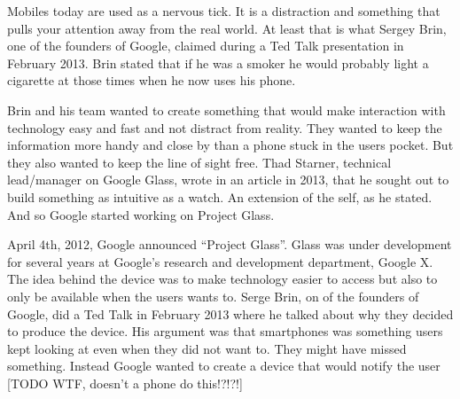 Mobiles today are used as a nervous tick. It is a distraction and something that pulls your attention away from the real world. At least that is what Sergey Brin, one of the founders of Google, claimed during a Ted Talk presentation in February 2013.\cite{tedtalkWhyGlass} Brin stated that if he was a smoker he would probably light a cigarette at those times when he now uses his phone.

Brin and his team wanted to create something that would make interaction with technology easy and fast and not distract from reality. They wanted to keep the information more handy and close by than a phone stuck in the users pocket. But they also wanted to keep the line of sight free. Thad Starner, technical lead/manager on Google Glass, wrote in an article in 2013,\cite{6504855} that he sought out to build something as intuitive as a watch. An extension of the self, as he stated. And so Google started working on Project Glass. 








April 4th, 2012, Google announced ``Project Glass''. Glass was under development for several years at Google's research and development department, Google X. The idea behind the device was to make technology easier to access but also to only be available when the users wants to. Serge Brin, on of the founders of Google, did a Ted Talk in February 2013 where he talked about why they decided to produce the device. His argument was that smartphones was something users kept looking at even when they did not want to. They might have missed something. Instead Google wanted to create a device that would notify the user [TODO WTF, doesn't a phone do this!?!?!]

